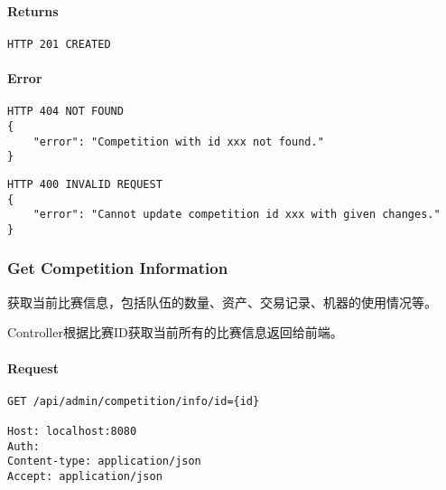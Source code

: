 \documentclass{article}
\begin{document}
\paragraph*{Returns}
\begin{lstlisting}
HTTP 201 CREATED
\end{lstlisting}

\paragraph*{Error}
\begin{lstlisting}
HTTP 404 NOT FOUND
{
    "error": "Competition with id xxx not found."
}
\end{lstlisting}

\begin{lstlisting}
HTTP 400 INVALID REQUEST
{
    "error": "Cannot update competition id xxx with given changes."
}
\end{lstlisting}

\subsubsection{Get Competition Information}
获取当前比赛信息，包括队伍的数量、资产、交易记录、机器的使用情况等。

Controller根据比赛ID获取当前所有的比赛信息返回给前端。

\paragraph*{Request}
\begin{lstlisting}
GET /api/admin/competition/info/id={id}

Host: localhost:8080
Auth:
Content-type: application/json
Accept: application/json
\end{lstlisting}
\end{document}
